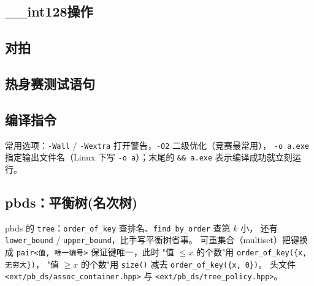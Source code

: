 \documentclass[11pt,a4paper,twocolumn]{ctexart}  %
\begin{document}
\subsection{\_\_int128操作}


\subsection{对拍}




\subsection{热身赛测试语句}




\subsection{编译指令}
常用选项：\texttt{-Wall} / \texttt{-Wextra} 打开警告，\texttt{-O2} 二级优化（竞赛最常用），
\texttt{-o a.exe} 指定输出文件名（Linux 下写 \texttt{-o a}）；末尾的
\texttt{\&\& a.exe} 表示编译成功就立刻运行。






\subsection{pbds：平衡树(名次树)}
pbds 的 \texttt{tree}：\texttt{order\_of\_key} 查排名、\texttt{find\_by\_order} 查第 $k$ 小，
还有 \texttt{lower\_bound} / \texttt{upper\_bound}，比手写平衡树省事。
可重集合（multiset）把键换成 \texttt{pair<值, 唯一编号>} 保证键唯一，此时
"值 $\le x$ 的个数"用 \texttt{order\_of\_key(\{x, 无穷大\})}，
"值 $\ge x$ 的个数"用 \texttt{size()} 减去 \texttt{order\_of\_key(\{x, 0\})}。
头文件 \texttt{<ext/pb\_ds/assoc\_container.hpp>} 与 \texttt{<ext/pb\_ds/tree\_policy.hpp>}。

\end{document}
